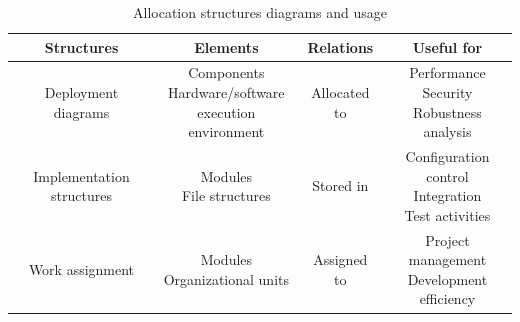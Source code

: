 \documentclass[12pt, a4paper]{report}
\begin{document}
        \begin{table}[H]
            \centering
            \begin{tabular}{|c|ccc|}
            \hline
            \textbf{Structures}         & \textbf{Elements}                                                         & \textbf{Relations}    & \textbf{Useful for}                                                   \\ \hline
            Deployment diagrams         & \makecell{Components\\Hardware/software\\execution environment}       & Allocated to          & \makecell{Performance\\Security\\Robustness analysis}                 \\ \hline
            Implementation structures   & \makecell{Modules\\File structures}                                       & Stored in             & \makecell{Configuration control\\Integration\\Test activities}        \\ \hline
            Work assignment             & \makecell{Modules\\Organizational units}                                  & Assigned to           & \makecell{Project management\\Development efficiency}                 \\ \hline
            \end{tabular}
            \caption{Allocation structures diagrams and usage}
        \end{table}
\end{document}
